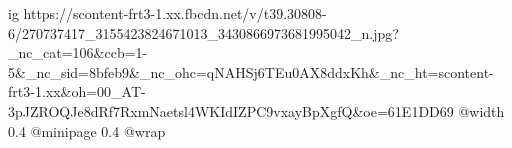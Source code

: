  
 
 
 
 

\ifcmt
  ig https://scontent-frt3-1.xx.fbcdn.net/v/t39.30808-6/270737417_3155423824671013_3430866973681995042_n.jpg?_nc_cat=106&ccb=1-5&_nc_sid=8bfeb9&_nc_ohc=qNAHSj6TEu0AX8ddxKh&_nc_ht=scontent-frt3-1.xx&oh=00_AT-3pJZROQJe8dRf7RxmNaetsl4WKIdIZPC9vxayBpXgfQ&oe=61E1DD69
  @width 0.4
  @minipage 0.4
  @wrap \parpic[r]
\fi
